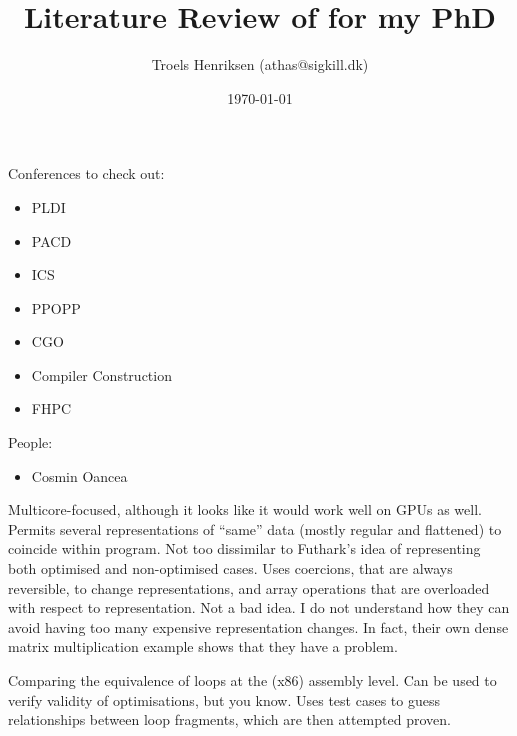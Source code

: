 \documentclass[a4paper, oneside, final]{memoir}
\title{Literature Review of for my PhD}
\author{Troels Henriksen (athas@sigkill.dk)}
\date{\today}
\begin{document}
\frontmatter

\maketitle
\thispagestyle{empty}

Conferences to check out:

\begin{itemize}
\item PLDI
\item PACD
\item ICS
\item PPOPP
\item CGO
\item Compiler Construction
\item FHPC
\end{itemize}

People:

\begin{itemize}
\item Cosmin Oancea
\end{itemize}

\begin{quote}
\end{quote}

Multicore-focused, although it looks like it would work well on GPUs
as well.  Permits several representations of ``same'' data (mostly
regular and flattened) to coincide within program.  Not too dissimilar
to Futhark's idea of representing both optimised and non-optimised
cases.  Uses coercions, that are always reversible, to change
representations, and array operations that are overloaded with respect
to representation.  Not a bad idea.  I do not understand how they can
avoid having too many expensive representation changes.  In fact,
their own dense matrix multiplication example shows that they have a
problem.

\begin{quote}
\end{quote}

Comparing the equivalence of loops at the (x86) assembly level.  Can
be used to verify validity of optimisations, but you know.  Uses test
cases to guess relationships between loop fragments, which are then
attempted proven.

\begin{quote}
\end{quote}
\end{document}
